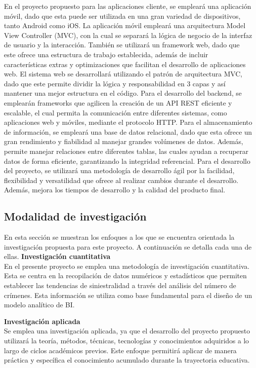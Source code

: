 \bigbreak

En el proyecto propuesto para las aplicaciones cliente, se empleará una aplicación móvil, dado que esta puede ser utilizada en una gran variedad de
dispositivos, tanto Android como iOS. La aplicación móvil empleará una arquitectura Model View Controller (MVC), con la cual se separará la lógica de
negocio de la interfaz de usuario y la interacción. También se utilizará un framework web, dado que este ofrece una estructura de trabajo establecida,
además de incluir características extras y optimizaciones que facilitan el desarrollo de aplicaciones web. El sistema web se desarrollará utilizando el
patrón de arquitectura MVC, dado que este permite dividir la lógica y responsabilidad en 3 capas y así mantener una mejor estructura en el código.
Para el desarrollo del backend, se emplearán frameworks que agilicen la creación de un API REST eficiente y escalable, el cual permita la comunicación
entre diferentes sistemas, como aplicaciones web y móviles, mediante el protocolo HTTP. Para el almacenamiento de información, se empleará una base de
datos relacional, dado que esta ofrece un gran rendimiento y fiabilidad al manejar grandes volúmenes de datos. Además, permite manejar relaciones entre
diferentes tablas, las cuales ayudan a recuperar datos de forma eficiente, garantizando la integridad referencial. Para el desarrollo del proyecto, se
utilizará una metodología de desarrollo ágil por la facilidad, flexibilidad y versatilidad que ofrece al realizar cambios durante el desarrollo. Además,
mejora los tiempos de desarrollo y la calidad del producto final.

\subsection{Modalidad de investigación}
En esta sección se muestran los enfoques a los que se encuentra orientada la investigación propuesta para este proyecto. A continuación se detalla
cada una de ellas.
\bigbreak
\textbf{Investigación cuantitativa}\\

En el presente proyecto se emplea una metodología de investigación cuantitativa. Esta se centra en la recopilación de
datos numéricos y estadísticos que permiten establecer las tendencias de siniestralidad a través del análisis del número
de crímenes. Esta información se utiliza como base fundamental para el diseño de un modelo analítico de BI.

\bigbreak
\textbf{Investigación aplicada}\\
Se emplea una investigación aplicada, ya que el desarrollo del proyecto propuesto utilizará la teoría, métodos,
técnicas, tecnologías y conocimientos adquiridos a lo largo de ciclos académicos previos. Este enfoque permitirá
aplicar de manera práctica y específica el conocimiento acumulado durante la trayectoria educativa.

